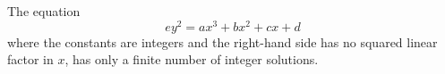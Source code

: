 \begin{proposition}
    The equation
\[
    ey^2=ax^3+bx^2+cx+d
\]
    where the constants are integers and the right-hand side has no squared linear factor in $x$, has only a finite number of integer solutions.
\end{proposition}
